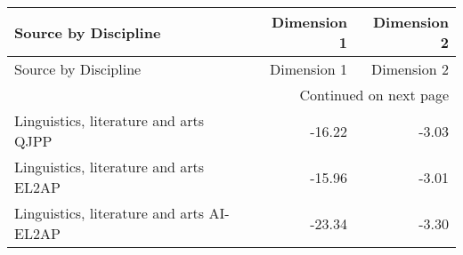 \begin{longtable}{lrr}
\toprule
Source by Discipline & Dimension 1 & Dimension 2 \\
\midrule
\endfirsthead
\toprule
Source by Discipline & Dimension 1 & Dimension 2 \\
\midrule
\endhead
\midrule
\multicolumn{3}{r}{Continued on next page} \\
\midrule
\endfoot
\bottomrule
\endlastfoot
Linguistics, literature and arts QJPP & -16.22 & -3.03 \\
Linguistics, literature and arts EL2AP & -15.96 & -3.01 \\
Linguistics, literature and arts AI-EL2AP & -23.34 & -3.30 \\
\end{longtable}
